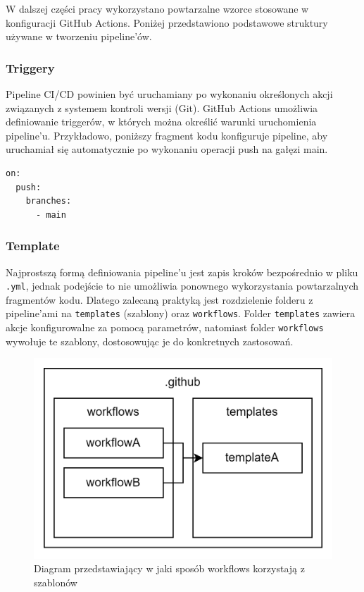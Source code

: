 \documentclass{article}
\begin{document}
W dalszej części pracy wykorzystano powtarzalne wzorce stosowane w konfiguracji GitHub Actions. Poniżej przedstawiono podstawowe struktury używane w tworzeniu pipeline’ów.

\subsubsection{Triggery}

Pipeline CI/CD powinien być uruchamiany po wykonaniu określonych akcji związanych z systemem kontroli wersji (Git). GitHub Actions umożliwia definiowanie triggerów, w których można określić warunki uruchomienia pipeline'u. Przykładowo, poniższy fragment kodu konfiguruje pipeline, aby uruchamiał się automatycznie po wykonaniu operacji push na gałęzi main.

\begin{lstlisting}[caption=Fragment kodu z triggerem ustawionym na push na main]
on:
  push:
    branches:
      - main
\end{lstlisting}


\subsubsection{Template}

Najprostszą formą definiowania pipeline’u jest zapis kroków bezpośrednio w pliku \lstinline|.yml|, jednak podejście to nie umożliwia ponownego wykorzystania powtarzalnych fragmentów kodu. Dlatego zalecaną praktyką jest rozdzielenie folderu z pipeline'ami na \lstinline|templates| (szablony) oraz \lstinline|workflows|. Folder \lstinline|templates| zawiera akcje konfigurowalne za pomocą parametrów, natomiast folder \lstinline|workflows| wywołuje te szablony, dostosowując je do konkretnych zastosowań.

\begin{figure}[H]
    \centering
    \includegraphics[width=0.5\linewidth]{templatesAndWorkflows.png}
    \caption{Diagram przedstawiający w jaki sposób workflows korzystają z szablonów}
    \label{fig:enter-label}
\end{figure}
\end{document}
